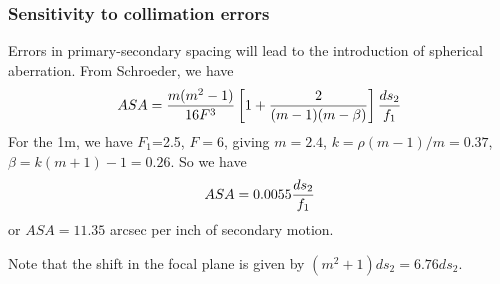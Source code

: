 \documentclass{article}[12pt]
\begin{document}
\subsubsection{Sensitivity to collimation errors}

Errors in primary-secondary spacing will lead to the introduction of spherical
aberration. From Schroeder, we have
$$ASA = {m (m^2-1)\over 16 F^3} \left[1+{2\over (m-1)(m-\beta)}\right] {ds_2\over f_1}$$
For the 1m, we have $F_1$=2.5, $F=6$, giving $m=2.4$, 
$k=\rho (m-1)/m  = 0.37$, $\beta = k(m+1)-1 = 0.26$. So we have
$$ASA = 0.0055 {ds_2\over f_1}$$
or $ASA = 11.35$  arcsec per inch of secondary motion.

Note that the shift in the focal plane is given by $(m^2+1)ds_2 = 6.76 ds_2$.

%
%
%
%
%
\end{document}
